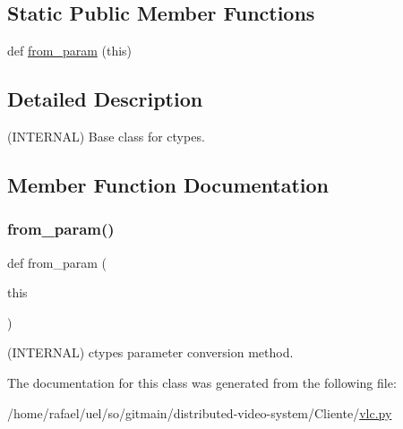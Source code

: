 \subsection*{Static Public Member Functions}
\begin{DoxyCompactItemize}
\item 
def \hyperlink{classvlc_1_1___ctype_a84e3e5e8b888c8efa4d09bb413ebcb7b}{from\+\_\+param} (this)
\end{DoxyCompactItemize}


\subsection{Detailed Description}
\begin{DoxyVerb}(INTERNAL) Base class for ctypes.
\end{DoxyVerb}
 

\subsection{Member Function Documentation}
\mbox{\label{classvlc_1_1___ctype_a84e3e5e8b888c8efa4d09bb413ebcb7b}} 
\subsubsection{\texorpdfstring{from\+\_\+param()}{from\_param()}}
{\footnotesize\ttfamily def from\+\_\+param (\begin{DoxyParamCaption}\item[{}]{this }\end{DoxyParamCaption})\hspace{0.3cm}{\ttfamily [static]}}

\begin{DoxyVerb}(INTERNAL) ctypes parameter conversion method.
\end{DoxyVerb}
 

The documentation for this class was generated from the following file\+:\begin{DoxyCompactItemize}
\item 
/home/rafael/uel/so/gitmain/distributed-\/video-\/system/\+Cliente/\hyperlink{vlc_8py}{vlc.\+py}\end{DoxyCompactItemize}
